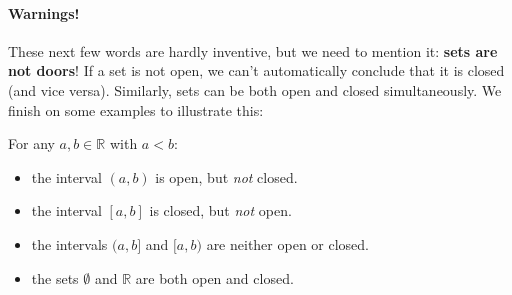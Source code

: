 \documentclass[
  17pt,
  a4paper]{extarticle}
\providecommand{\tightlist}{%
  \setlength{\itemsep}{0pt}\setlength{\parskip}{0pt}}
\theoremstyle{plain}
\theoremstyle{plain}
\theoremstyle{plain}
\theoremstyle{plain}
\theoremstyle{plain}
\theoremstyle{definition}
\theoremstyle{definition}
\theoremstyle{definition}
\theoremstyle{remark}
\renewcommand{\;}{\,}
\begin{document}
\hypertarget{warnings}{%
\paragraph*{Warnings!}\label{warnings}}

These next few words are hardly inventive, but we need to mention it: \textbf{sets are not doors}! If a set is not open, we can't automatically conclude that it is closed (and vice versa). Similarly, sets can be both open and closed simultaneously. We finish on some examples to illustrate this:

For any \(a,b \in \mathbb{R}\) with \(a < b\):

\begin{itemize}
\tightlist
\item
  the interval \((a,b)\) is open, but \emph{not} closed.
\item
  the interval \([a,b]\) is closed, but \emph{not} open.
\item
  the intervals \((a,b]\) and \([a,b)\) are neither open or closed.
\item
  the sets \(\emptyset\) and \(\mathbb{R}\) are both open and closed.
\end{itemize}
\end{document}
